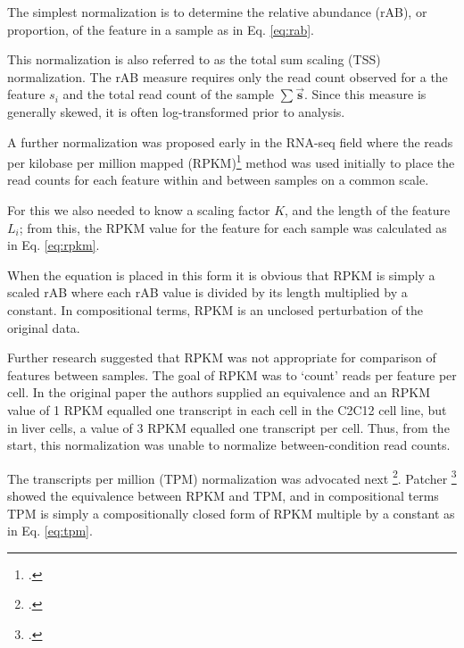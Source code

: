 The simplest normalization is to determine the relative abundance (rAB), or proportion, of the \ith feature in a sample as in Eq. \ref{eq:rab}.


This normalization is also referred to as the total sum scaling (TSS) normalization. The rAB measure requires only the read count observed for a the feature $s_i$ and the total read count of the sample $\sum{\vec{\textbf{s}}}$. Since this measure is generally skewed, it is often log-transformed prior to analysis. 

A further normalization was proposed early in the RNA-seq field where the reads per kilobase per million mapped (RPKM)\footcite{Mortazavi:2008} method was used initially to place the read counts for each feature within and between samples on a common scale. 

For this we also needed to know a scaling factor $K$, and the length of the feature $L_i$; from this, the RPKM value for the \ith feature for each sample was calculated as in Eq. \ref{eq:rpkm}.

When the equation is placed in this form it is obvious that RPKM is simply a scaled rAB where each rAB value is divided by its length multiplied by a constant. In compositional terms, RPKM is an unclosed perturbation of the original data.

Further research suggested that RPKM was not appropriate for comparison of features between samples. The goal of RPKM was to `count' reads per feature per cell.  In the original paper the authors supplied an equivalence and an RPKM value of 1 RPKM equalled one transcript in each cell in the C2C12 cell line, but in liver cells, a value of 3 RPKM equalled one transcript per cell. Thus, from the start, this normalization was unable to normalize between-condition read counts.  

The transcripts per million (TPM) normalization was advocated next \footcite{Li:2010aa}. Patcher \footcite{Pachter:2011} showed the equivalence between RPKM and TPM, and in compositional terms TPM is simply a compositionally closed form of RPKM multiple by a constant as in Eq. \ref{eq:tpm}.


